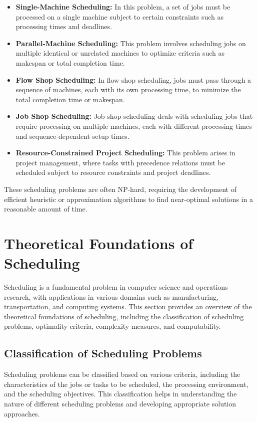 \documentclass[12pt]{book} %
\begin{document}
\begin{itemize}
    \item \textbf{Single-Machine Scheduling:} In this problem, a set of jobs must be processed on a single machine subject to certain constraints such as processing times and deadlines.
    \item \textbf{Parallel-Machine Scheduling:} This problem involves scheduling jobs on multiple identical or unrelated machines to optimize criteria such as makespan or total completion time.
    \item \textbf{Flow Shop Scheduling:} In flow shop scheduling, jobs must pass through a sequence of machines, each with its own processing time, to minimize the total completion time or makespan.
    \item \textbf{Job Shop Scheduling:} Job shop scheduling deals with scheduling jobs that require processing on multiple machines, each with different processing times and sequence-dependent setup times.
    \item \textbf{Resource-Constrained Project Scheduling:} This problem arises in project management, where tasks with precedence relations must be scheduled subject to resource constraints and project deadlines.
\end{itemize}

These scheduling problems are often NP-hard, requiring the development of efficient heuristic or approximation algorithms to find near-optimal solutions in a reasonable amount of time.


\section{Theoretical Foundations of Scheduling}

Scheduling is a fundamental problem in computer science and operations research, with applications in various domains such as manufacturing, transportation, and computing systems. This section provides an overview of the theoretical foundations of scheduling, including the classification of scheduling problems, optimality criteria, complexity measures, and computability.

\subsection{Classification of Scheduling Problems}

Scheduling problems can be classified based on various criteria, including the characteristics of the jobs or tasks to be scheduled, the processing environment, and the scheduling objectives. This classification helps in understanding the nature of different scheduling problems and developing appropriate solution approaches.
\end{document}
